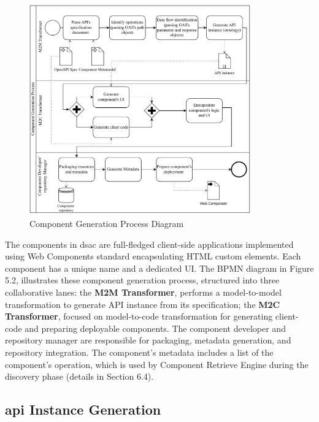 \begin{figure}[hbt]
\hypertarget{fig:component-gen-diagram}{%
\centering
\includegraphics[width=0.85\textwidth]{../figures/MyFigures/ComponentGeneratorBPMN.drawio.pdf}
\captionsetup{justification=centering}
\caption{Component Generation Process Diagram}\label{fig:component-gen-diagram}
}
\end{figure}

The components in \gls{dsac} are full-fledged client-side applications
implemented using Web Components standard encapsulating HTML custom
elements. Each component has a unique name and a dedicated UI. The BPMN
diagram in Figure 5.2, illustrates these component generation process,
structured into three collaborative lanes: the \textbf{M2M Transformer},
performs a model-to-model transformation to generate API instance from
its specification; the \textbf{M2C Transformer}, focused on
model-to-code transformation for generating client-code and preparing
deployable components. The component developer and repository manager
are responsible for packaging, metadata generation, and repository
integration. The component's metadata includes a list of the component's
operation, which is used by Component Retrieve Engine during the
discovery phase (details in Section 6.4).

\vspace{-10pt}
\hypertarget{sec:api-instance}{%
\subsection{\gls{api} Instance Generation}\label{sec:api-instance}}
\vspace{10pt}

